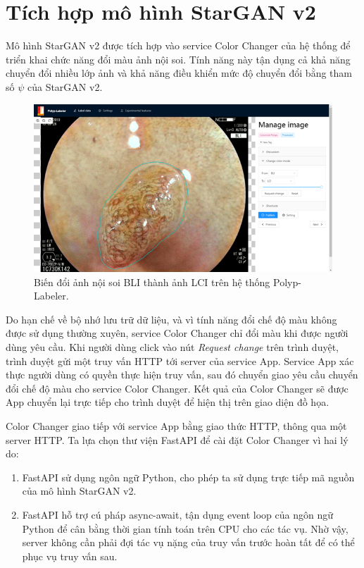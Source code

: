 \documentclass[12pt]{extreport}
\begin{document}
\section{Tích hợp mô hình StarGAN v2}

Mô hình StarGAN v2 được tích hợp vào service Color Changer của hệ thống để triển khai chức năng đổi màu ảnh nội soi. Tính năng này tận dụng cả khả năng chuyển đổi nhiều lớp ảnh và khả năng điều khiển mức độ chuyển đổi bằng tham số $ \psi $ của StarGAN v2.

\begin{figure}[H]
    \centering
    \includegraphics[width=0.7\linewidth]{figure42png.png}
    \caption{Biến đổi ảnh nội soi BLI thành ảnh LCI trên hệ thống Polyp-Labeler.}
\end{figure}

Do hạn chế về bộ nhớ lưu trữ dữ liệu, và vì tính năng đổi chế độ màu không được sử dụng thường xuyên, service Color Changer chỉ đổi màu khi được người dùng yêu cầu. Khi người dùng click vào nút \textit{Request change} trên trình duyệt, trình duyệt gửi một truy vấn HTTP tới server của service App. Service App xác thực người dùng có quyền thực hiện truy vấn, sau đó chuyển giao yêu cầu chuyển đổi chế độ màu cho service Color Changer. Kết quả của Color Changer sẽ được App chuyển lại trực tiếp cho trình duyệt để hiện thị trên giao diện đồ họa.

Color Changer giao tiếp với service App bằng giao thức HTTP, thông qua một server HTTP. Ta lựa chọn thư viện FastAPI để cài đặt Color Changer vì hai lý do:
\begin{enumerate}
    \item FastAPI sử dụng ngôn ngữ Python, cho phép ta sử dụng trực tiếp mã nguồn của mô hình StarGAN v2.
    \item FastAPI hỗ trợ cú pháp async-await, tận dụng event loop của ngôn ngữ Python để cân bằng thời gian tính toán trên CPU cho các tác vụ. Nhờ vậy, server không cần phải đợi tác vụ nặng của truy vấn trước hoàn tất để có thể phục vụ truy vấn sau.
\end{enumerate}
\end{document}
